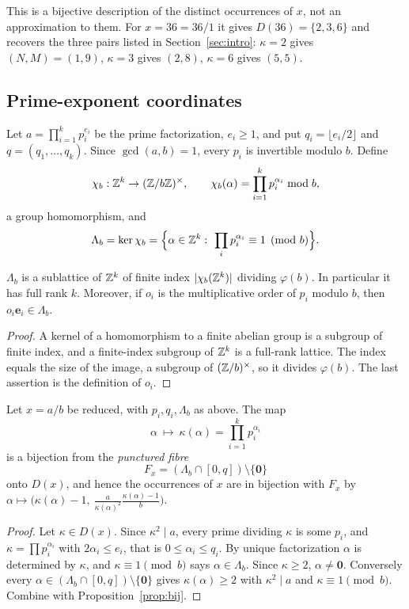 This is a bijective description of the distinct occurrences of $x$, not an approximation to them. For $x=36=36/1$ it gives $D(36)=\{2,3,6\}$ and recovers the three pairs listed in Section~\ref{sec:intro}: $\kappa=2$ gives $(N,M)=(1,9)$, $\kappa=3$ gives $(2,8)$, $\kappa=6$ gives $(5,5)$.

\subsection{Prime-exponent coordinates}

Let $a=\prod_{i=1}^kp_i^{e_i}$ be the prime factorization, $e_i\ge1$, and put $q_i=\lfloor e_i/2\rfloor$ and $q=(q_1,\dots,q_k)$. Since $\gcd(a,b)=1$, every $p_i$ is invertible modulo $b$. Define
\[
  \chi_b:\mathbb Z^k\to(\mathbb Z/b\mathbb Z)^\times,\qquad \chi_b(\alpha)=\prod_{i=1}^kp_i^{\alpha_i}\bmod b,
\]
a group homomorphism, and
\[
  \Lambda_b=\ker\chi_b=\Bigl\{\alpha\in\Z^k:\ \prod_{i}p_i^{\alpha_i}\equiv1\pmod b\Bigr\}.
\]

\begin{lemma}\label{lem:kernel}
$\Lambda_b$ is a sublattice of $\mathbb Z^k$ of finite index $|\chi_b(\mathbb Z^k)|$ dividing $\varphi(b)$. In particular it has full rank $k$. Moreover, if $o_i$ is the multiplicative order of $p_i$ modulo $b$, then $o_i\mathbf e_i\in\Lambda_b$.
\end{lemma}
\begin{proof}
A kernel of a homomorphism to a finite abelian group is a subgroup of finite index, and a finite-index subgroup of $\mathbb Z^k$ is a full-rank lattice. The index equals the size of the image, a subgroup of $(\mathbb Z/b)^\times$, so it divides $\varphi(b)$. The last assertion is the definition of $o_i$.
\end{proof}

\begin{theorem}\label{thm:occ}
Let $x=a/b$ be reduced, with $p_i,q_i,\Lambda_b$ as above. The map
\[
  \alpha\ \longmapsto\ \kappa(\alpha)=\prod_{i=1}^kp_i^{\alpha_i}
\]
is a bijection from the \emph{punctured fibre}
\[
  F_x=(\Lambda_b\cap[0,q])\setminus\{\mathbf0\}
\]
onto $D(x)$, and hence the occurrences of $x$ are in bijection with $F_x$ by $\alpha\mapsto\bigl(\kappa(\alpha)-1,\ \tfrac{a}{\kappa(\alpha)^2}\tfrac{\kappa(\alpha)-1}{b}\bigr)$.
\end{theorem}
\begin{proof}
Let $\kappa\in D(x)$. Since $\kappa^2\mid a$, every prime dividing $\kappa$ is some $p_i$, and $\kappa=\prod p_i^{\alpha_i}$ with $2\alpha_i\le e_i$, that is $0\le\alpha_i\le q_i$. By unique factorization $\alpha$ is determined by $\kappa$, and $\kappa\equiv1\pmod b$ says $\alpha\in\Lambda_b$. Since $\kappa\ge2$, $\alpha\ne\mathbf 0$. Conversely every $\alpha\in(\Lambda_b\cap[0,q])\setminus\{\mathbf0\}$ gives $\kappa(\alpha)\ge2$ with $\kappa^2\mid a$ and $\kappa\equiv1\pmod b$. Combine with Proposition~\ref{prop:bij}.
\end{proof}

